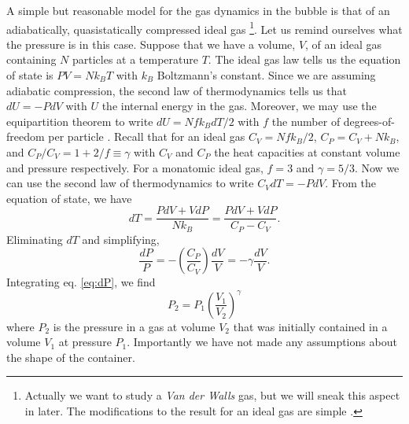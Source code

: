 \documentclass[prb,aps,nofootinbib,superscriptaddress,floatfix]{revtex4-2}
\begin{document}
A simple but reasonable model for the gas dynamics in the bubble is that of an adiabatically, quasistatically compressed ideal gas \cite{brenner2002single} \footnote{Actually we want to study a \emph{Van der Walls} gas, but we will sneak this aspect in later. The modifications to the result for an ideal gas are simple \cite{sivasubramanian2002temperature}.}. Let us remind ourselves what the pressure is in this case. Suppose that we have a volume, $V$, of an ideal gas containing $N$ particles at a temperature $T$. The ideal gas law tells us the equation of state is $PV=Nk_BT$ with $k_B$ Boltzmann's constant. Since we are assuming adiabatic compression, the second law of thermodynamics tells us that $dU=-PdV$ with $U$ the internal energy in the gas. Moreover, we may use the equipartition theorem to write $dU=N f k_B dT/2$ with $f$ the number of degrees-of-freedom per particle \cite{schroeder1999introduction}. Recall that for an ideal gas $C_V = N f k_B/2$, $C_P = C_V+N k_B$, and $C_P/C_V = 1+2/f \equiv \gamma$ with $C_V$ and $C_P$ the heat capacities at constant volume and pressure respectively. For a monatomic ideal gas, $f=3$ and $\gamma=5/3$. Now we can use the second law of thermodynamics to write $C_V dT = -P dV$. From the equation of state, we have
\begin{equation}
    dT = \frac{PdV+VdP}{Nk_B}=\frac{PdV+VdP}{C_P-C_V}.
\end{equation}
Eliminating $dT$ and simplifying, 
\begin{equation}
    \frac{dP}{P}=-\left(\frac{C_P}{C_V}\right) \frac{dV}{V} = -\gamma \frac{dV}{V}.
    \label{eq:dP}
\end{equation}
Integrating eq. \ref{eq:dP}, we find 
\begin{equation}
    P_2 = P_1 \left(\frac{V_1}{V_2}\right)^\gamma
\label{eq:P}
\end{equation}
where $P_2$ is the pressure in a gas at volume $V_2$ that was initially contained in a volume $V_1$ at pressure $P_1$. Importantly we have not made any assumptions about the shape of the container. 
\end{document}
